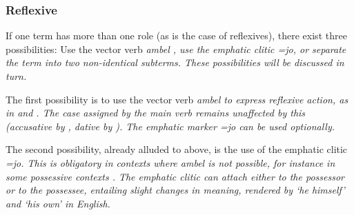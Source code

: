 \subsubsection{Reflexive}\label{sec:func:Reflexive}
If one term has more than one role (as is the case of reflexives), there exist three possibilities:  Use the vector verb \em ambel \em {}, use the emphatic clitic \em =jo\em {}, or separate the term into two non-identical subterms. These possibilities will be discussed in turn.

The first possibility is to use the vector verb \em ambel \em to express reflexive action, as in  and . The case assigned by the main verb remains unaffected by this (accusative by , dative by ). The emphatic marker \em =jo \em can be used optionally.





The second possibility, already alluded to above, is the use of the emphatic clitic \em =jo\em. This is obligatory in contexts where \em ambel \em is not possible, for instance in some possessive contexts . The emphatic clitic can attach either to the possessor or to the possessee, entailing slight changes in meaning, rendered by `he himself' and `his own' in English.





